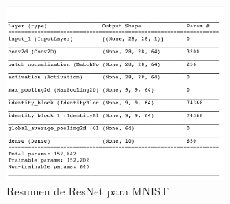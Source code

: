 \begin{figure}[h!]
    \centering
    \includegraphics[width=0.65\textwidth]{images/model_details/mnist_nonlinear_good_summary.png}
    \caption{Resumen de ResNet para MNIST}
    \label{resnet summary}
\end{figure}